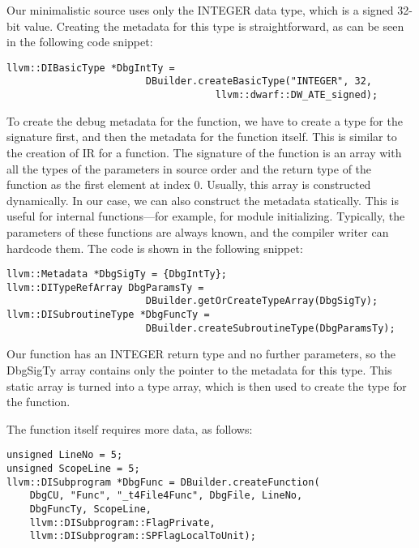 Our minimalistic source uses only the INTEGER data type, which is a signed 32-bit value. Creating the metadata for this type is straightforward, as can be seen in the following code snippet:\par

\begin{lstlisting}[caption={}]
llvm::DIBasicType *DbgIntTy =
						DBuilder.createBasicType("INTEGER", 32,
									llvm::dwarf::DW_ATE_signed);
\end{lstlisting}

To create the debug metadata for the function, we have to create a type for the signature first, and then the metadata for the function itself. This is similar to the creation of IR for a function. The signature of the function is an array with all the types of the parameters in source order and the return type of the function as the first element at index 0. Usually, this array is constructed dynamically. In our case, we can also construct the metadata statically. This is useful for internal functions—for example, for module initializing. Typically, the parameters of these functions are always known, and the compiler writer can hardcode them. The code is shown in the following snippet:\par

\begin{lstlisting}[caption={}]
llvm::Metadata *DbgSigTy = {DbgIntTy};
llvm::DITypeRefArray DbgParamsTy =
						DBuilder.getOrCreateTypeArray(DbgSigTy);
llvm::DISubroutineType *DbgFuncTy =
						DBuilder.createSubroutineType(DbgParamsTy);
\end{lstlisting}

Our function has an INTEGER return type and no further parameters, so the DbgSigTy array contains only the pointer to the metadata for this type. This static array is turned into a type array, which is then used to create the type for the function.\par

The function itself requires more data, as follows:\par

\begin{lstlisting}[caption={}]
unsigned LineNo = 5;
unsigned ScopeLine = 5;
llvm::DISubprogram *DbgFunc = DBuilder.createFunction(
	DbgCU, "Func", "_t4File4Func", DbgFile, LineNo,
	DbgFuncTy, ScopeLine, 
	llvm::DISubprogram::FlagPrivate,
	llvm::DISubprogram::SPFlagLocalToUnit);
\end{lstlisting}

